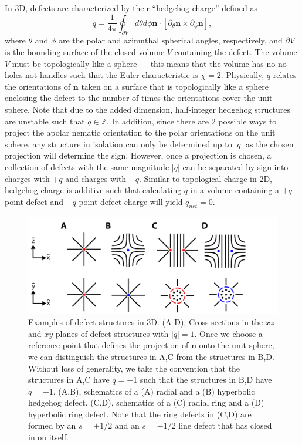 In 3D, defects are characterized by their ``hedgehog charge'' defined as
\begin{equation}
  q = \frac{1}{4 \pi} \oint_{\partial V}d \theta d \phi \mathbf{n} \cdot \left [ \partial_{\theta} \mathbf{n} \times \partial_{\phi} \mathbf{n} \right ],\label{e:2-hedCharge}
\end{equation}
 where $\theta$ and $\phi$ are the polar and azimuthal spherical angles, respectively, and $\partial V$ is the bounding surface of the closed volume $V$ containing the defect.
The volume $V$ must be topologically like a sphere --- this means that the volume has no no holes not handles such that the Euler characteristic is $\chi = 2$.
Physically, $q$ relates the orientations of $\mathbf{n}$ taken on a surface that is topologically like a sphere enclosing the defect to the number of times the orientations cover the unit sphere.
Note that due to the added dimension, half-integer hedgehog structures are unstable such that $q \in \mathbb{Z}$.
In addition, since there are 2 possible ways to project the apolar nematic orientation to the polar orientations on the unit sphere, any structure in isolation can only be determined up to $|q|$ as the chosen projection will determine the sign.
However, once a projection is chosen, a collection of defects with the same magnitude $|q|$ can be separated by sign into charges with $+q$ and charges with $-q$.
Similar to topological charge in 2D, hedgehog charge is additive such that calculating $q$ in a volume containing a $+q$ point defect and $-q$ point defect charge will yield $q_{net} = 0$. \\

\begin{figure}[h]
  \centering
  \includegraphics{figures/C2/Ch2-Figs_3DMeas.png}
  \caption{Examples of defect structures in 3D.
  (A-D), Cross sections in the $xz$ and $xy$ planes of defect structures with $|q| = 1$.
  Once we choose a reference point that defines the projection of $\mathbf{n}$ onto the unit sphere, we can distinguish the structures in A,C from the structures in B,D.
  Without loss of generality, we take the convention that the structures in A,C have $q = +1$ such that the structures in B,D have $q = -1$.
  (A,B), schematics of a (A) radial and a (B) hyperbolic hedgehog defect.
  (C,D), schematics of a (C) radial ring and a (D) hyperbolic ring defect.
  Note that the ring defects in (C,D) are formed by an $s = +1/2 $ and an $s = -1/2$ line defect that has closed in on itself.}\label{f:2-3DMeas}
\end{figure}

